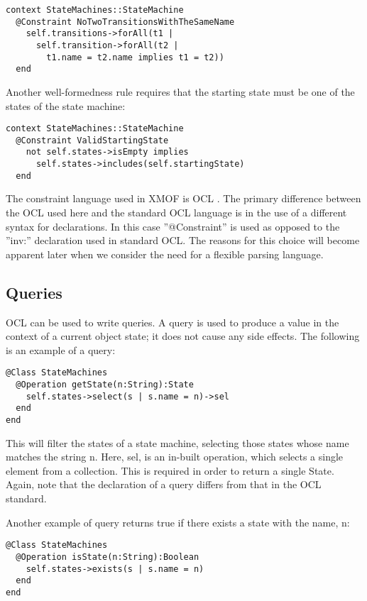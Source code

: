 \small
\begin{verbatim}
context StateMachines::StateMachine
  @Constraint NoTwoTransitionsWithTheSameName
    self.transitions->forAll(t1 |
      self.transition->forAll(t2 |
        t1.name = t2.name implies t1 = t2))
  end
\end{verbatim}
\normalsize

Another well-formedness rule requires that the starting state must
be one of the states of the state machine:

\small
\begin{verbatim}
context StateMachines::StateMachine
  @Constraint ValidStartingState
    not self.states->isEmpty implies
      self.states->includes(self.startingState)
  end
\end{verbatim}
\normalsize

The constraint language used in XMOF is OCL \cite{Warmer}. The
primary difference between the OCL used here and the standard OCL
language is in the use of a different syntax for declarations. In
this case ''@Constraint'' is used as opposed to the ''inv:''
declaration used in standard OCL. The reasons for this choice will
become apparent later when we consider the need for a flexible
parsing language.

\subsection{Queries}

OCL can be used to write queries. A query is used to produce a
value in the context of a current object state; it does not cause
any side effects. The following is an example of a query:

\small
\begin{verbatim}
@Class StateMachines
  @Operation getState(n:String):State
    self.states->select(s | s.name = n)->sel
  end
end
\end{verbatim}
\normalsize

This will filter the states of a state machine, selecting those
states whose name matches the string n. Here, sel, is an in-built
operation, which selects a single element from a collection. This
is required in order to return a single State. Again, note that
the declaration of a query differs from that in the OCL standard.

\noindent Another example of query returns true if there exists a
state with the name, n:

\small
\begin{verbatim}
@Class StateMachines
  @Operation isState(n:String):Boolean
    self.states->exists(s | s.name = n)
  end
end
\end{verbatim}
\normalsize

